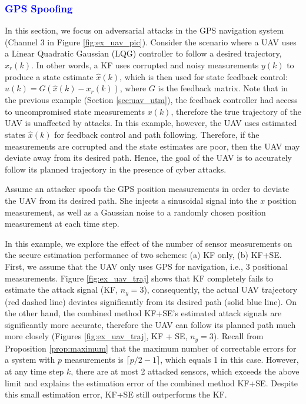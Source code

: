 \documentclass[12pt, conference, a4paper, twoside]{IEEEconf_mod}
\begin{document}
\vspace{1mm}
\subsubsection{\textcolor{blue}{GPS Spoofing}}

In this section, we focus on adversarial attacks in the GPS navigation system (Channel 3 in Figure \ref{fig:ex_uav_pic}). Consider the scenario where a UAV uses a Linear Quadratic Gaussian (LQG) controller to follow a desired trajectory, $x_r(k)$. In other words, a KF uses corrupted and noisy measurements $y(k)$ to produce a state estimate $\hat x(k)$, which is then used for state feedback control: $u(k) = G (\hat x(k) - x_r(k))$, where $G$ is the feedback matrix. 
Note that in the previous example (Section \ref{sec:uav_utm}), the feedback controller had access to uncompromised state measurements $x(k)$, therefore the true trajectory of the UAV is unaffected by attacks. 
In this example, however, the UAV uses estimated states $\hat x(k)$ for feedback control and path following. Therefore, if the measurements are corrupted and the state estimates are poor, then the UAV may deviate away from its desired path. Hence, the goal of the UAV is to accurately follow its planned trajectory in the presence of cyber attacks. 

Assume an attacker spoofs the GPS position measurements in order to deviate the UAV from its desired path. She injects a sinusoidal signal into the $x$ position measurement, as well as a Gaussian noise to a randomly chosen position measurement at each time step. 

In this example, we explore the effect of the number of sensor measurements on the secure estimation performance of two schemes: (a) KF only, (b) KF+SE.
First, we assume that the UAV only uses GPS for navigation, i.e., 3 positional measurements. 
Figure \ref{fig:ex_uav_traj} shows that KF completely fails to estimate the attack signal (KF, $n_y = 3$), consequently, the actual UAV trajectory (red dashed line) deviates significantly from its desired path (solid blue line).
On the other hand, the combined method KF+SE's estimated attack signals are significantly more accurate, therefore the UAV can follow its planned path much more closely (Figures \ref{fig:ex_uav_traj}, KF + SE, $n_y = 3$).
Recall from Proposition \ref{prop:maximum} that the maximum number of correctable errors for a system with $p$ measurements is $\lceil p/2-1 \rceil$, which equals 1 in this case. However, at any time step $k$, there are at most 2 attacked sensors, which exceeds the above limit and explains the estimation error of the combined method KF+SE. Despite this small estimation error, KF+SE still outperforms the KF.
\end{document}
